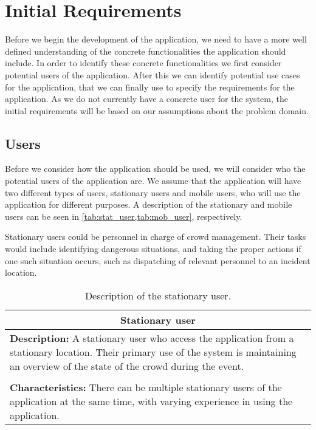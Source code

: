 \section{Initial Requirements}\label{sec:s1_requirements}
Before we begin the development of the application, we need to have a more well defined understanding of the concrete functionalities the application should include. In order to identify these concrete functionalities we first consider potential users of the application. After this we can identify potential use cases for the application, that we can finally use to specify the requirements for the application. As we do not currently have a concrete user for the system, the initial requirements will be based on our assumptions about the problem domain. 

\subsection{Users}
Before we consider how the application should be used, we will consider who the potential users of the application are. We assume that the application will have two different types of users, stationary users and mobile users, who will use the application for different purposes. A description of the stationary and mobile users can be seen in \cref{tab:stat_user,tab:mob_user}, respectively.

Stationary users could be personnel in charge of crowd management. Their tasks would include identifying dangerous situations, and taking the proper actions if one such situation occurs, such as dispatching of relevant personnel to an incident location.

\begin{table}[h!]
    \centering
    \begin{tabularx}{/4}{X}
        \toprule
        \multicolumn{1}{c}{\textbf{Stationary user}} \\ 
        \midrule
        \textbf{Description:} A stationary user who access the application from a stationary location. Their primary use of the system is maintaining an overview of the state of the crowd during the event. \\
        \\
        \textbf{Characteristics:} There can be multiple stationary users of the application at the same time, with varying experience in using the application. \\
        \bottomrule
    \end{tabularx}
    \caption{Description of the stationary user.}
    \label{tab:stat_user}
\end{table}

